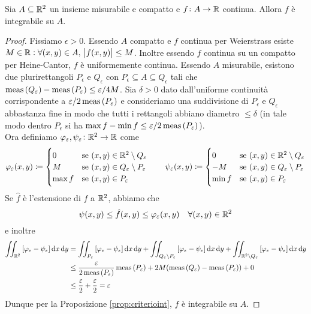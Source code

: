 \begin{thm}
	Sia $ A \subseteq \mathbb{R}^2 $ un insieme misurabile e compatto e $ f \colon A \to \mathbb{R} $ continua. Allora $ f $ è integrabile su $ A $.
\end{thm}
%
\begin{proof}
	Fissiamo $ \epsilon > 0 $. Essendo $ A $ compatto e $ f $ continua per Weierstrass esiste $ M \in \mathbb{R} : \forall (x, y) \in A, \ \abs{f(x, y)} \leq M $. Inoltre essendo $ f $ continua su un compatto per Heine-Cantor, $ f $ è uniformemente continua. Essendo $ A $ misurabile, esistono due plurirettangoli $ P_\epsilon $ e $ Q_\epsilon $ con $ P_\epsilon \subseteq A \subseteq Q_\epsilon $ tali che $ \operatorname{meas}{(Q_\varepsilon)} - \operatorname{meas}{(P_\varepsilon)} \leq \varepsilon / 4M $. Sia $ \delta > 0 $ dato dall'uniforme continuità corrispondente a $ \varepsilon / 2 \operatorname{meas}{(P_\varepsilon)} $ e consideriamo una suddivisione di $ P_\epsilon $ e $ Q_\epsilon $ abbastanza fine in modo che tutti i rettangoli abbiano diametro $ \leq \delta $ (in tale modo dentro $ P_\epsilon $ si ha $ \max f - \min f \leq \varepsilon / 2 \operatorname{meas}{(P_\varepsilon)} $). \\	
	Ora definiamo $ \varphi_\varepsilon, \psi_\varepsilon \colon \mathbb{R}^2 \to \mathbb{R} $ come
	\[
		\varphi_\varepsilon(x, y) \coloneqq 
		\begin{cases}
			0 & \text{se $ (x, y) \in \mathbb{R}^2 \setminus Q_\varepsilon $} \\
			M & \text{se $ (x, y) \in Q_\varepsilon \setminus P_\varepsilon $} \\
			\max f & \text{se $ (x, y) \in P_\varepsilon $}
		\end{cases}
		\qquad
		\psi_\varepsilon(x, y) \coloneqq 
		\begin{cases}
			0 & \text{se $ (x, y) \in \mathbb{R}^2 \setminus Q_\varepsilon $} \\
			- M & \text{se $ (x, y) \in Q_\varepsilon \setminus P_\varepsilon $} \\
			\min f & \text{se $ (x, y) \in P_\varepsilon $}
		\end{cases}
	\]
	Se $ \hat{f} $ è l'estensione di $ f $ a $ \mathbb{R}^2 $, abbiamo che 
	\[
		\psi(x, y) \leq \hat{f}(x, y) \leq \varphi_\varepsilon(x, y) \quad \forall (x, y) \in \mathbb{R}^2
	\]
	e inoltre
	\begin{align*}
		\iint_{\R^2} \left[\varphi_\epsilon - \psi_\epsilon\right] \dif{x} \dif{y} & = \iint_{P_{\epsilon}} \left[\varphi_\epsilon - \psi_\epsilon\right] \dif{x} \dif{y} + \iint_{Q_\epsilon \setminus P_\epsilon} \left[\varphi_\epsilon - \psi_\epsilon\right] \dif{x} \dif{y} + \iint_{\R^2\setminus Q_\epsilon} \left[\varphi_\epsilon - \psi_\epsilon\right] \dif{x} \dif{y} \\
		& \leq \frac{\epsilon}{2 \meas{(P_\epsilon)}} \meas{(P_\epsilon)} + 2 M (\meas{(Q_\epsilon)} - \meas{(P_\epsilon)}) + 0 \\
		& \leq \frac{\epsilon}{2} + \frac{\epsilon}{2} = \epsilon
	\end{align*}
	Dunque per la Proposizione \ref{prop:criterioint}, $ f $ è integrabile su $ A $.
 \end{proof}

